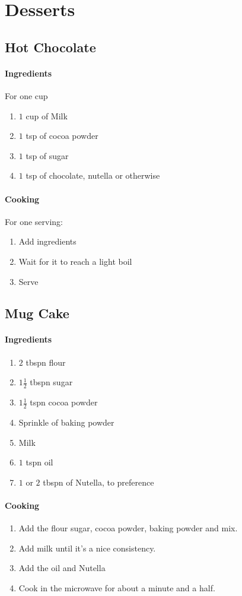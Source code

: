 \chapter{Desserts}

\section{Hot Chocolate}
\subsubsection{Ingredients}
For one cup
\begin{enumerate}
    \item $1$ cup of Milk
    \item $1$ tsp of cocoa powder
    \item $1$ tsp of sugar
    \item $1$ tsp of chocolate, nutella or otherwise
\end{enumerate}

\subsubsection{Cooking}
For one serving:
\begin{enumerate}
    \item Add ingredients
    \item Wait for it to reach a light boil
    \item Serve
\end{enumerate}

\section{Mug Cake}
\subsubsection{Ingredients}
\begin{enumerate}
    \item $2$ tbspn flour
    \item $1\frac{1}{2}$ tbspn sugar
    \item $1\frac{1}{2}$ tspn cocoa powder
    \item Sprinkle of baking powder
    \item Milk
    \item $1$ tspn oil
    \item $1$ or $2$ tbspn of Nutella, to preference
\end{enumerate}

\subsubsection{Cooking}
\begin{enumerate}
    \item Add the flour sugar, cocoa powder, baking powder and mix.
    \item Add milk until it's a nice consistency.
    \item Add the oil and Nutella
    \item Cook in the microwave for about a minute and a half.
\end{enumerate}
